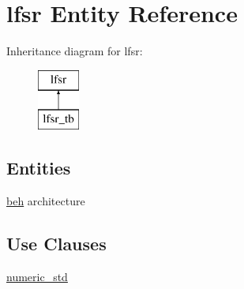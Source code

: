 \hypertarget{classlfsr}{\section{lfsr Entity Reference}
\label{classlfsr}
}
Inheritance diagram for lfsr\-:\begin{figure}[H]
\begin{center}
\leavevmode
\includegraphics[height=2.000000cm]{classlfsr}
\end{center}
\end{figure}
\subsection*{Entities}
\begin{DoxyCompactItemize}
\item 
\hyperlink{classlfsr_1_1beh}{beh} architecture
\end{DoxyCompactItemize}
\subsection*{Use Clauses}
 \begin{DoxyCompactItemize}
\item 
\hypertarget{classlfsr_a2edc34402b573437d5f25fa90ba4013e}{\hyperlink{classlfsr_a2edc34402b573437d5f25fa90ba4013e}{numeric\-\_\-std}   }\label{classlfsr_a2edc34402b573437d5f25fa90ba4013e}

\end{DoxyCompactItemize}
